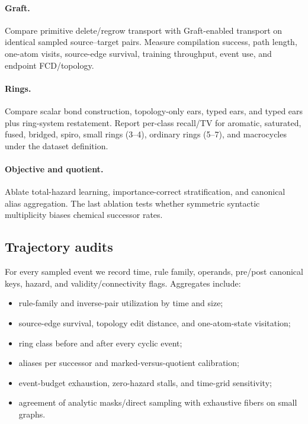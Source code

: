 \documentclass{article}
\theoremstyle{definition}
\theoremstyle{remark}
\begin{document}
\paragraph{Graft.}
Compare primitive delete/regrow transport with Graft-enabled transport on identical sampled source--target pairs. Measure compilation success, path length, one-atom visits, source-edge survival, training throughput, event use, and endpoint FCD/topology.

\paragraph{Rings.}
Compare scalar bond construction, topology-only ears, typed ears, and typed ears plus ring-system restatement. Report per-class recall/TV for aromatic, saturated, fused, bridged, spiro, small rings (3--4), ordinary rings (5--7), and macrocycles under the dataset definition.

\paragraph{Objective and quotient.}
Ablate total-hazard learning, importance-correct stratification, and canonical alias aggregation. The last ablation tests whether symmetric syntactic multiplicity biases chemical successor rates.

\subsection{Trajectory audits}

For every sampled event we record time, rule family, operands, pre/post canonical keys, hazard, and validity/connectivity flags. Aggregates include:
\begin{itemize}[leftmargin=*]
    \item rule-family and inverse-pair utilization by time and size;
    \item source-edge survival, topology edit distance, and one-atom-state visitation;
    \item ring class before and after every cyclic event;
    \item aliases per successor and marked-versus-quotient calibration;
    \item event-budget exhaustion, zero-hazard stalls, and time-grid sensitivity;
    \item agreement of analytic masks/direct sampling with exhaustive fibers on small graphs.
\end{itemize}
\end{document}
